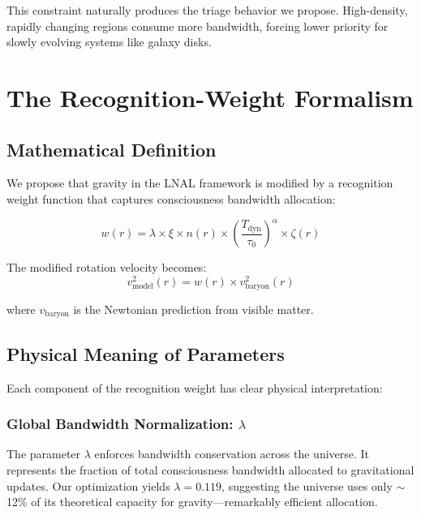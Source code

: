 \documentclass[twocolumn,prd,amsmath,amssymb,aps,superscriptaddress,nofootinbib]{revtex4-2}
\begin{document}
This constraint naturally produces the triage behavior we propose. High-density, rapidly changing regions consume more bandwidth, forcing lower priority for slowly evolving systems like galaxy disks.

\section{The Recognition-Weight Formalism}
\label{sec:formalism}

\subsection{Mathematical Definition}

We propose that gravity in the LNAL framework is modified by a recognition weight function that captures consciousness bandwidth allocation:

\begin{equation}
w(r) = \lambda \times \xi \times n(r) \times \left(\frac{T_{\text{dyn}}}{\tau_0}\right)^\alpha \times \zeta(r)
\label{eq:recognition_weight}
\end{equation}

The modified rotation velocity becomes:
\begin{equation}
v_{\text{model}}^2(r) = w(r) \times v_{\text{baryon}}^2(r)
\label{eq:v_model}
\end{equation}

where $v_{\text{baryon}}$ is the Newtonian prediction from visible matter.

\subsection{Physical Meaning of Parameters}

Each component of the recognition weight has clear physical interpretation:

\subsubsection{Global Bandwidth Normalization: $\lambda$}

The parameter $\lambda$ enforces bandwidth conservation across the universe. It represents the fraction of total consciousness bandwidth allocated to gravitational updates. Our optimization yields $\lambda = 0.119$, suggesting the universe uses only $\sim$12\% of its theoretical capacity for gravity---remarkably efficient allocation.
\end{document}
